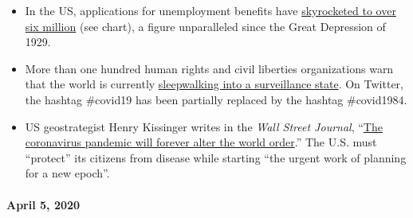 \begin{itemize}
\item
  In the US, applications for unemployment benefits have
  \href{https://www.reuters.com/article/us-health-coronavirus-usa-layoffs/us-weekly-jobless-claims-seen-at-record-high-again-idUSKBN21K0FX}{skyrocketed
  to over six million} (see chart), a figure unparalleled since the
  Great Depression of 1929.
\item
  More than one hundred human rights and civil liberties organizations
  warn that the world is currently
  \href{https://www.dailymail.co.uk/news/article-8181381/World-sleepwalking-surveillance-state-rights-groups-warn.html}{sleepwalking
  into a surveillance state}. On Twitter, the hashtag \#covid19 has been
  partially replaced by the hashtag \#covid1984.
\item
  US geostrategist Henry Kissinger writes in the \emph{Wall Street
  Journal},
  ``\href{https://www.wsj.com/articles/the-coronavirus-pandemic-will-forever-alter-the-world-order-11585953005}{The
  coronavirus pandemic will forever alter the world order}.'' The U.S.
  must ``protect'' its citizens from disease while starting ``the urgent
  work of planning for a new epoch''.
\end{itemize}

\hypertarget{april-5-2020}{%
\paragraph{April 5, 2020}\label{april-5-2020}}

